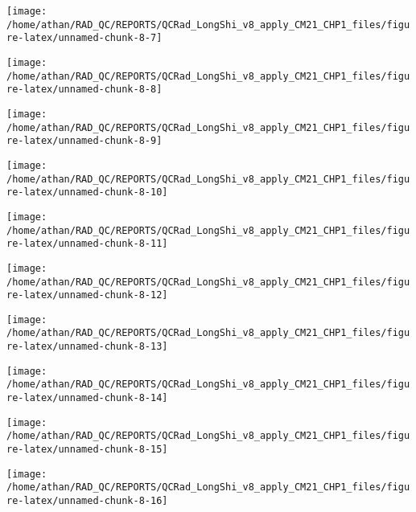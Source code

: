 \documentclass[
  10pt,
  a4paper,oneside]{article}
\begin{document}
\begin{center}\texttt{[image: /home/athan/RAD\_QC/REPORTS/QCRad\_LongShi\_v8\_apply\_CM21\_CHP1\_files/figure-latex/unnamed-chunk-8-7]} \end{center}

\begin{center}\texttt{[image: /home/athan/RAD\_QC/REPORTS/QCRad\_LongShi\_v8\_apply\_CM21\_CHP1\_files/figure-latex/unnamed-chunk-8-8]} \end{center}

\begin{center}\texttt{[image: /home/athan/RAD\_QC/REPORTS/QCRad\_LongShi\_v8\_apply\_CM21\_CHP1\_files/figure-latex/unnamed-chunk-8-9]} \end{center}

\begin{center}\texttt{[image: /home/athan/RAD\_QC/REPORTS/QCRad\_LongShi\_v8\_apply\_CM21\_CHP1\_files/figure-latex/unnamed-chunk-8-10]} \end{center}

\begin{center}\texttt{[image: /home/athan/RAD\_QC/REPORTS/QCRad\_LongShi\_v8\_apply\_CM21\_CHP1\_files/figure-latex/unnamed-chunk-8-11]} \end{center}

\begin{center}\texttt{[image: /home/athan/RAD\_QC/REPORTS/QCRad\_LongShi\_v8\_apply\_CM21\_CHP1\_files/figure-latex/unnamed-chunk-8-12]} \end{center}

\begin{center}\texttt{[image: /home/athan/RAD\_QC/REPORTS/QCRad\_LongShi\_v8\_apply\_CM21\_CHP1\_files/figure-latex/unnamed-chunk-8-13]} \end{center}

\begin{center}\texttt{[image: /home/athan/RAD\_QC/REPORTS/QCRad\_LongShi\_v8\_apply\_CM21\_CHP1\_files/figure-latex/unnamed-chunk-8-14]} \end{center}

\begin{center}\texttt{[image: /home/athan/RAD\_QC/REPORTS/QCRad\_LongShi\_v8\_apply\_CM21\_CHP1\_files/figure-latex/unnamed-chunk-8-15]} \end{center}

\begin{center}\texttt{[image: /home/athan/RAD\_QC/REPORTS/QCRad\_LongShi\_v8\_apply\_CM21\_CHP1\_files/figure-latex/unnamed-chunk-8-16]} \end{center}
\end{document}
